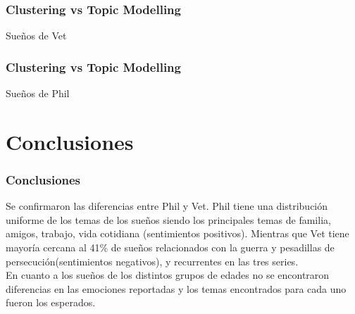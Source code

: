 \documentclass{beamer}
\begin{document}
\begin{frame}
\frametitle{Clustering vs Topic Modelling}
Sueños de Vet
\end{frame}


\begin{frame}
\frametitle{Clustering vs Topic Modelling}
Sueños de Phil
\end{frame}

\section{Conclusiones}
\begin{frame}
\frametitle{Conclusiones}
Se confirmaron las diferencias entre Phil y Vet. Phil tiene una distribución uniforme de los temas de los sueños siendo los principales temas de familia, amigos, trabajo, vida cotidiana (sentimientos positivos). Mientras que Vet tiene mayoría cercana al 41\% de sueños relacionados con la guerra y pesadillas de persecución(sentimientos negativos), y recurrentes en las tres series.\\
En cuanto a los sueños de los distintos grupos de edades no se encontraron diferencias en las emociones reportadas y los temas encontrados para cada uno fueron los esperados.
\end{frame}
\end{document}
